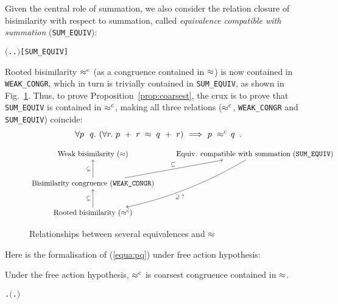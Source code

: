Given the central role of
 summation, we also consider the relation closure of bisimilarity
 with respect to summation, called \emph{equivalence compatible with summation}
(\texttt{SUM_EQUIV}): %
\begin{alltt}
    \HOLTokenDefEquality{} \ensuremath{(}\HOLTokenLambda{} . \HOLSymConst{\HOLTokenForall{}}.  \HOLSymConst{\ensuremath{+}}  \HOLSymConst{\HOLTokenWeakEQ}  \HOLSymConst{\ensuremath{+}} \ensuremath{)}\hfill{[SUM_EQUIV]}
\end{alltt}

Rooted bisimilarity $\mathrel{\approx^{\rm{c}}}$ (as a congruence contained in
$\approx$) is now contained in \texttt{WEAK_CONGR},
which in turn is trivially contained in \texttt{SUM_EQUIV}, as shown
in Fig.~\ref{fig:relationship}. Thus, to prove Proposition~\ref{prop:coarsest},
the crux is to prove that \texttt{SUM_EQUIV} is contained in
$\mathrel{\approx^{\rm{c}}}$,
making all three relations
($\mathrel{\approx^{\rm{c}}}$, \texttt{WEAK_CONGR} and \texttt{SUM_EQUIV}) coincide:
\begin{equation}
\label{equa:pq}
\forall p\ \ q.\ ( \forall r.\ p\ +\ r \;\approx\; q\ +\ r ) \
\Longrightarrow\ p\ \mathrel{\approx^{\rm{c}}}\ \! q\enspace.
\end{equation}

\begin{figure}[ht]
\begin{displaymath}
\xymatrix{
{\textrm{Weak bisimilarity } (\approx)} & {\textrm{Equiv.
    compatible with summation (\texttt{SUM\_EQUIV})}}
\ar@/^3ex/[ldd]^{\supseteq\; ?}\\
{\textrm{Bisimilarity congruence (\texttt{WEAK\_CONGR})}}
\ar[u]^{\subseteq} \ar[ru]^{\subseteq} \\
{\textrm{Rooted bisimilarity } (\rapprox)} \ar[u]^{\subseteq}
}
\end{displaymath}
\caption{Relationships between several equivalences and $\approx$}
\label{fig:relationship}
\end{figure}

Here is the formalisation of (\ref{equa:pq}) under free action hypothesis:
\begin{theorem}
  \label{thm:coarsestR}
  Under the free action hypothesis, $\mathrel{\approx^{\rm{c}}}$ is coarsest congruence contained in $\approx$.
\begin{alltt}
\HOLTokenTurnstile{} \HOLSymConst{\HOLTokenForall{}} .   \HOLSymConst{\HOLTokenConj{}}   \HOLSymConst{\HOLTokenImp{}} \ensuremath{(}\HOLSymConst{\HOLTokenForall{}}.  \HOLSymConst{\ensuremath{+}}  \HOLSymConst{\HOLTokenWeakEQ}  \HOLSymConst{\ensuremath{+}} \ensuremath{)} \HOLSymConst{\HOLTokenImp{}}  \HOLSymConst{\HOLTokenObsCongr} 
\end{alltt}
\end{theorem}

